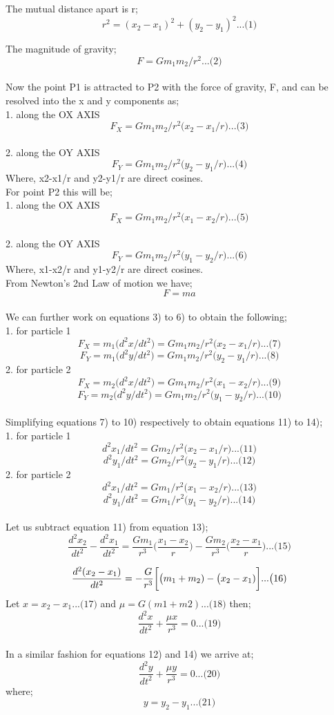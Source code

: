 The mutual distance apart is r;
\[ r^2 =  (x_2-x_1)^2 + (y_2-y_1)^2  ... \big(1)\]

The magnitude of gravity;
\[ F =  Gm_1m_2 / r^2 ... \big(2)\]
\\
Now the point P1 is attracted to P2 with the force of gravity, F, and can be resolved into the x and y components as;\\
1. along the OX AXIS
\[F_X = Gm_1m_2 / r^2\big(x_2-x_1/r) ... \big(3)\] 
\\
2. along the OY AXIS
\[F_Y = Gm_1m_2 / r^2\big(y_2-y_1/r) ... \big(4)\]
Where, x2-x1/r and y2-y1/r are direct cosines.
\\
For point P2 this will be;\\
1. along the OX AXIS
\[F_X = Gm_1m_2 / r^2\big(x_1-x_2/r) ... \big(5)\] 
\\
2. along the OY AXIS
\[F_Y = Gm_1m_2 / r^2\big(y_1-y_2/r) ... \big(6)\]
Where, x1-x2/r and y1-y2/r are direct cosines.
\\
From Newton’s 2nd Law of motion we have;
\[F=ma\]
\\
We can further work on equations 3) to 6) to obtain the following;\\
1. for particle 1
\[F_X = m_1\big(d^2x/dt^2)= Gm_1m_2 / r^2\big(x_2-x_1/r) ... \big(7)\] 
\[F_Y = m_1\big(d^2y/dt^2)= Gm_1m_2 / r^2\big(y_2-y_1/r) ... \big(8)\]
2. for particle 2
\[F_X = m_2\big(d^2x/dt^2)= Gm_1m_2 / r^2\big(x_1-x_2/r) ... \big(9)\]
\[F_Y = m_2\big(d^2y/dt^2)= Gm_1m_2 / r^2\big(y_1-y_2/r) ... \big(10)\]
\\
Simplifying equations 7) to 10) respectively to obtain equations 11) to 14);\\
1. for particle 1
\[d^2x_1/dt^2= Gm_2 / r^2\big(x_2-x_1/r) ... \big(11)\] 
\[d^2y_1/dt^2= Gm_2 / r^2\big(y_2-y_1/r) ... \big(12)\]
2. for particle 2
\[d^2x_1/dt^2= Gm_1 / r^2\big(x_1-x_2/r) ... \big(13)\]
\[d^2y_1/dt^2= Gm_1 / r^2\big(y_1-y_2/r) ... \big(14)\]
\\
Let us subtract equation 11) from equation 13);
\[\frac{d^2x_2}{dt^2} - \frac{d^2x_1}{dt^2}= \frac{Gm_1} {r^3}\big(\frac{x_1-x_2}{r}) - \frac{Gm_2} {r^3}\big(\frac{x_2-x_1}{r}) ... \big(15)\]

\[\frac{d^2\small(x_2-x_1)}{dt^2}= -\frac{G} {r^3}\bigg[\big(m_1+m_2)-\big(x_2-x_1)\bigg] ... \big(16)\]
Let  \(x = x_2-x_1 ... \big(17)\) and 
\(\mu = G(m1+m2) ... \big(18)\) 
then;
\[\frac{d^2x}{dt^2}+\frac{\mu x}{r^3}=0 ... \big(19)\]
\\
In a similar fashion for equations 12) and 14) we arrive at;
\[\frac{d^2y}{dt^2}+\frac{\mu y}{r^3}=0 ... \big(20)\]
where;
\[y = y_2-y_1 ... \big(21)\]

